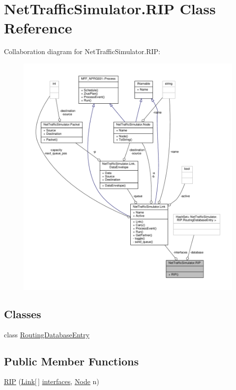 \hypertarget{classNetTrafficSimulator_1_1RIP}{\section{Net\-Traffic\-Simulator.\-R\-I\-P Class Reference}
\label{classNetTrafficSimulator_1_1RIP}
}


Collaboration diagram for Net\-Traffic\-Simulator.\-R\-I\-P\-:\nopagebreak
\begin{figure}[H]
\begin{center}
\leavevmode
\includegraphics[width=350pt]{classNetTrafficSimulator_1_1RIP__coll__graph}
\end{center}
\end{figure}
\subsection*{Classes}
\begin{DoxyCompactItemize}
\item 
class \hyperlink{classNetTrafficSimulator_1_1RIP_1_1RoutingDatabaseEntry}{Routing\-Database\-Entry}
\end{DoxyCompactItemize}
\subsection*{Public Member Functions}
\begin{DoxyCompactItemize}
\item 
\hyperlink{classNetTrafficSimulator_1_1RIP_a3cf3404a78d33eb4c09ab71dfdf447ef}{R\-I\-P} (\hyperlink{classNetTrafficSimulator_1_1Link}{Link}\mbox{[}$\,$\mbox{]} \hyperlink{classNetTrafficSimulator_1_1RIP_ae6c643552f57399c710fe228342b0144}{interfaces}, \hyperlink{classNetTrafficSimulator_1_1Node}{Node} n)
\end{DoxyCompactItemize}
